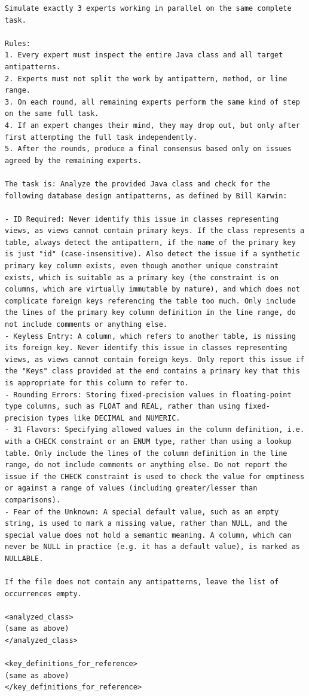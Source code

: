\captionsetup{type=figure}
\begin{lstlisting}[frame=none, basicstyle=\small, breaklines=true, breakatwhitespace=false, breakindent=0pt]
Simulate exactly 3 experts working in parallel on the same complete task.

Rules:
1. Every expert must inspect the entire Java class and all target antipatterns.
2. Experts must not split the work by antipattern, method, or line range.
3. On each round, all remaining experts perform the same kind of step on the same full task.
4. If an expert changes their mind, they may drop out, but only after first attempting the full task independently.
5. After the rounds, produce a final consensus based only on issues agreed by the remaining experts.

The task is: Analyze the provided Java class and check for the following database design antipatterns, as defined by Bill Karwin:

- ID Required: Never identify this issue in classes representing views, as views cannot contain primary keys. If the class represents a table, always detect the antipattern, if the name of the primary key is just "id" (case-insensitive). Also detect the issue if a synthetic primary key column exists, even though another unique constraint exists, which is suitable as a primary key (the constraint is on columns, which are virtually immutable by nature), and which does not complicate foreign keys referencing the table too much. Only include the lines of the primary key column definition in the line range, do not include comments or anything else.
- Keyless Entry: A column, which refers to another table, is missing its foreign key. Never identify this issue in classes representing views, as views cannot contain foreign keys. Only report this issue if the "Keys" class provided at the end contains a primary key that this is appropriate for this column to refer to.
- Rounding Errors: Storing fixed-precision values in floating-point type columns, such as FLOAT and REAL, rather than using fixed-precision types like DECIMAL and NUMERIC.
- 31 Flavors: Specifying allowed values in the column definition, i.e. with a CHECK constraint or an ENUM type, rather than using a lookup table. Only include the lines of the column definition in the line range, do not include comments or anything else. Do not report the issue if the CHECK constraint is used to check the value for emptiness or against a range of values (including greater/lesser than comparisons).
- Fear of the Unknown: A special default value, such as an empty string, is used to mark a missing value, rather than NULL, and the special value does not hold a semantic meaning. A column, which can never be NULL in practice (e.g. it has a default value), is marked as NULLABLE.

If the file does not contain any antipatterns, leave the list of occurrences empty.

<analyzed_class>
(same as above)
</analyzed_class>

<key_definitions_for_reference>
(same as above)
</key_definitions_for_reference>
\end{lstlisting}
